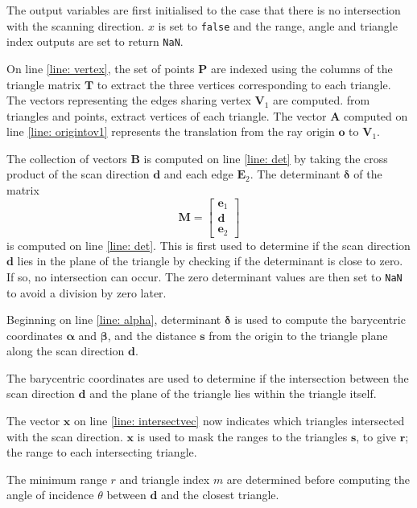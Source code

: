 	The output variables are first initialised to the case that there is no intersection with the scanning direction. $x$ is set to \texttt{false} and the range, angle and triangle index outputs are set to return \texttt{NaN}.
	
	On line \ref{line: vertex}, the set of points $\mathbf{P}$ are indexed using the columns of the triangle matrix $\mathbf{T}$ to extract the three vertices corresponding to each triangle.
	The vectors representing the edges sharing vertex $\mathbf{V}_1$ are computed.
	from triangles and points, extract vertices of each triangle.
	The vector $\mathbf{A}$ computed on line \ref{line: origintov1} represents the translation from the ray origin $\mathbf{o}$ to $\mathbf{V}_1$.
	
	The collection of vectors $\mathbf{B}$ is computed on line \ref{line: det} by taking the cross product of the scan direction $\mathbf{d}$ and each edge $\mathbf{E}_2$. The determinant $\bm{\delta}$ of the matrix
	\begin{equation}
		\mathbf{M} = 
			\begin{bmatrix} 
				\mathbf{e}_1 \\
				\mathbf{d}	 \\
				\mathbf{e}_2
			\end{bmatrix}
	\end{equation}
	is computed on line \ref{line: det}. This is first used to determine if the scan direction $\mathbf{d}$ lies in the plane of the triangle by checking if the determinant is close to zero. If so, no intersection can occur. The zero determinant values are then set to \texttt{NaN} to avoid a division by zero later.
	
	Beginning on line \ref{line: alpha}, determinant $\bm{\delta}$ is used to compute the barycentric coordinates $\bm{\alpha}$ and  $\bm{\beta}$, and the distance $\mathbf{s}$ from the origin to the triangle plane along the scan direction $\mathbf{d}$.
	
	The barycentric coordinates are used to determine if the intersection between the scan direction $\mathbf{d}$ and the plane of the triangle lies within the triangle itself. 
	
	The vector $\mathbf{x}$ on line \ref{line: intersectvec} now indicates which triangles intersected with the scan direction. $\mathbf{x}$ is used to mask the ranges to the triangles $\mathbf{s}$, to give $\mathbf{r}$; the range to each intersecting triangle. 
	
	The minimum range $r$ and triangle index $m$ are determined before computing the angle of incidence $\theta$ between $\mathbf{d}$ and the closest triangle.
	
